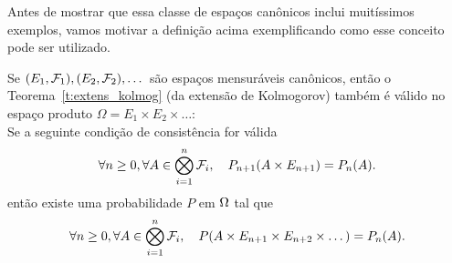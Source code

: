 Antes de mostrar que essa classe de espaços canônicos inclui muitíssimos exemplos, 
vamos motivar a definição acima exemplificando como esse conceito pode ser utilizado.

\begin{theorem}
  Se $(E_1,{\mathcal F}_1), (E_2,{\mathcal F}_2), \dots$ são espaços mensuráveis canônicos, então o Teorema~\ref{t:extens_kolmog} (da extensão de Kolmogorov)
  também é válido no espaço produto $\Omega = E_1 \times E_2 \times \dots$: \\
  Se a seguinte condição de consistência for válida
  \begin{equation}
   \forall n\ge 0, \forall A \in \bigotimes_{i=1}^n {\mathcal F}_i,\quad P_{n+1}(A\times E_{n+1})=P_n(A).
  \end{equation}
então existe uma probabilidade $P$ em $\Omega$ tal que 
    \begin{equation}
   \forall n\ge 0, \forall A \in \bigotimes_{i=1}^n {\mathcal F}_i,\quad P(A\times E_{n+1}\times E_{n+2}\times\dots )=P_n(A).
  \end{equation}
\end{theorem}

